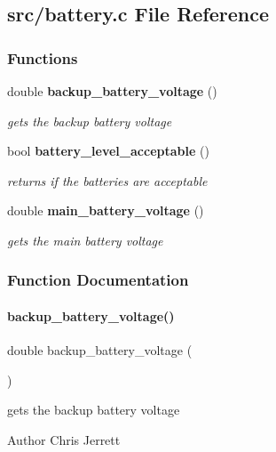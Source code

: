 \subsection{src/battery.c File Reference}
\label{battery_8c}
\subsubsection*{Functions}
\begin{DoxyCompactItemize}
\item 
double \textbf{ backup\+\_\+battery\+\_\+voltage} ()
\begin{DoxyCompactList}\small\item\em gets the backup battery voltage \end{DoxyCompactList}\item 
bool \textbf{ battery\+\_\+level\+\_\+acceptable} ()
\begin{DoxyCompactList}\small\item\em returns if the batteries are acceptable \end{DoxyCompactList}\item 
double \textbf{ main\+\_\+battery\+\_\+voltage} ()
\begin{DoxyCompactList}\small\item\em gets the main battery voltage \end{DoxyCompactList}\end{DoxyCompactItemize}


\subsubsection{Function Documentation}
\mbox{\label{battery_8c_a9b1c5cf7ddddebf63796050a1d4a9969}} 
\paragraph{backup\+\_\+battery\+\_\+voltage()}
{\footnotesize\ttfamily double backup\+\_\+battery\+\_\+voltage (\begin{DoxyParamCaption}{ }\end{DoxyParamCaption})}



gets the backup battery voltage 

\begin{DoxyAuthor}{Author}
Chris Jerrett 
\end{DoxyAuthor}


